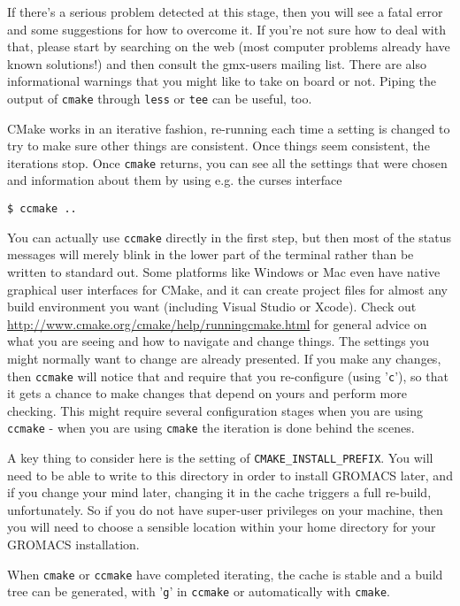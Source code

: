 \documentclass{article}[12pt,a4paper,twoside]
\newcommand{\gromacs}{GROMACS}
\newcommand{\cmake}{CMake}
\begin{document}
If there's a serious problem detected at this stage, then you will see
a fatal error and some suggestions for how to overcome it. If you're
not sure how to deal with that, please start by searching on the web
(most computer problems already have known solutions!) and then
consult the gmx-users mailing list. There are also informational
warnings that you might like to take on board or not. Piping the
output of \verb+cmake+ through \verb+less+ or \verb+tee+ can be
useful, too.

\cmake{} works in an iterative fashion, re-running each time a setting
is changed to try to make sure other things are consistent. Once
things seem consistent, the iterations stop. Once \verb+cmake+
returns, you can see all the settings that were chosen and information
about them by using e.g. the curses interface
\begin{verbatim}
$ ccmake ..
\end{verbatim}
You can actually use \verb+ccmake+ directly in the first step, but then
most of the status messages will merely blink in the lower part
of the terminal rather than be written to standard out. Some platforms
like Windows or Mac even have native graphical user interfaces for
\cmake{}, and it can create project files for almost any build environment
you want (including Visual Studio or Xcode).
Check out \url{http://www.cmake.org/cmake/help/runningcmake.html} for
general advice on what you are seeing and how to navigate and change
things. The settings you might normally want to change are already
presented. If you make any changes, then \verb+ccmake+ will notice
that and require that you re-configure (using '\verb+c+'), so that it
gets a chance to make changes that depend on yours and perform more
checking. This might require several configuration stages when you are
using \verb+ccmake+ - when you are using \verb+cmake+ the
iteration is done behind the scenes.

A key thing to consider here is the setting of
\verb+CMAKE_INSTALL_PREFIX+. You will need to be able to write to
this directory in order to install \gromacs{} later, and if you change
your mind later, changing it in the cache triggers a full re-build,
unfortunately. So if you do not have super-user privileges on your
machine, then you will need to choose a sensible location within your
home directory for your \gromacs{} installation.

When \verb+cmake+ or \verb+ccmake+ have completed iterating, the
cache is stable and a build tree can be generated, with '\verb+g+' in
\verb+ccmake+ or automatically with \verb+cmake+.
\end{document}
